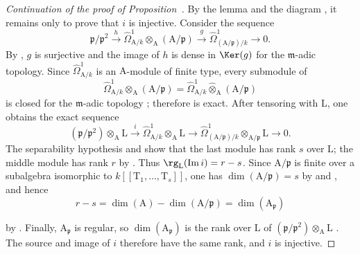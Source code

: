 \begin{proof}[Continuation of the proof of Proposition~{\rm{}}]
By the lemma and the diagram , it remains only to prove that $i$ is injective.
Consider the sequence
\begin{equation}
\label{0.22.7.2.6}
  \mathfrak{p}/\mathfrak{p}^2\xrightarrow{h}
  \widehat{\Omega}^1_{\mathrm{A}/k}\widehat{\otimes}_\mathrm{A}(\mathrm{A}/\mathfrak{p})
  \xrightarrow{g}\widehat{\Omega}^1_{(\mathrm{A}/\mathfrak{p})/k}\to 0.
  \tag{22.7.2.6}
\end{equation}
By , $g$ is surjective and the image of $h$ is dense in $\Ker(g)$ for the $\mathfrak{m}$-adic topology.
Since $\widehat{\Omega}^1_{\mathrm{A}/k}$ is an $\mathrm{A}$-module of finite type, every submodule of
\[
  \widehat{\Omega}^1_{\mathrm{A}/k}\otimes_\mathrm{A}(\mathrm{A}/\mathfrak{p})
  =\widehat{\Omega}^1_{\mathrm{A}/k}\widehat{\otimes}_\mathrm{A}(\mathrm{A}/\mathfrak{p})
\]
is closed for the $\mathfrak{m}$-adic topology ; therefore  is exact.
After tensoring with $\mathrm{L}$, one obtains the exact sequence
\[
  (\mathfrak{p}/\mathfrak{p}^2)\otimes_\mathrm{A}\mathrm{L}\xrightarrow{i}
  \widehat{\Omega}^1_{\mathrm{A}/k}\otimes_\mathrm{A}\mathrm{L}\to
  \widehat{\Omega}^1_{(\mathrm{A}/\mathfrak{p})/k}\otimes_{\mathrm{A}/\mathfrak{p}}\mathrm{L}\to 0.
\]
The separability hypothesis and  show that the last module has rank $s$ over $\mathrm{L}$; the middle module has rank $r$ by .
Thus $\rg_\mathrm{L}(\operatorname{Im}i)=r-s$.
Since $\mathrm{A}/\mathfrak{p}$ is finite over a subalgebra isomorphic to $k[[\mathrm{T}_1,\ldots,\mathrm{T}_s]]$, one has $\dim(\mathrm{A}/\mathfrak{p})=s$ by  and , and hence
\[
  r-s=\dim(\mathrm{A})-\dim(\mathrm{A}/\mathfrak{p})=\dim(\mathrm{A}_\mathfrak{p})
\]


by .
Finally, $\mathrm{A}_\mathfrak{p}$ is regular, so $\dim(\mathrm{A}_\mathfrak{p})$ is the rank over $\mathrm{L}$ of
$(\mathfrak{p}/\mathfrak{p}^2)\otimes_\mathrm{A}\mathrm{L}$ .
The source and image of $i$ therefore have the same rank, and $i$ is injective.
\end{proof}

